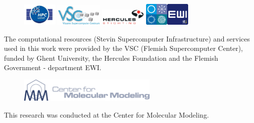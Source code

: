 \documentclass[11pt,a4paper,twoside]{book}
\begin{document}
		

\frontmatter

    

    \thispagestyle{empty}

    \cleardoublepage 
    \thispagestyle{empty}
    \thispagestyle{empty}

    \newpage
    \thispagestyle{empty}
    \noindent
    \\
	\vfill
	\begin{figure}[h!]
	  \includegraphics[width=0.15\textwidth]{acknowledge/HPCUGent.jpg} \hspace{0.3cm}
	  \includegraphics[width=0.2\textwidth]{acknowledge/logo_VSC_CMYK2.pdf} \hspace{0.3cm}
	  \includegraphics[width=0.2\textwidth]{acknowledge/hercules.png} \hspace{0.3cm}
	  \includegraphics[width=0.2\textwidth]{acknowledge/EWI.jpg} 
	\end{figure}
	    {\small
	    \noindent \textsf{The computational resources (Stevin Supercomputer Infrastructure) and services used in this work were provided by the VSC (Flemish Supercomputer Center), funded by Ghent University, the Hercules Foundation and the Flemish Government - department EWI.}}
    \vfill
    \begin{figure}[h!]
	    \includegraphics[width=0.6\textwidth]{cmm.png}
    \end{figure}
    {\small
    \noindent \textsf{This research was conducted at the Center for Molecular Modeling.}
    }
\end{document}
